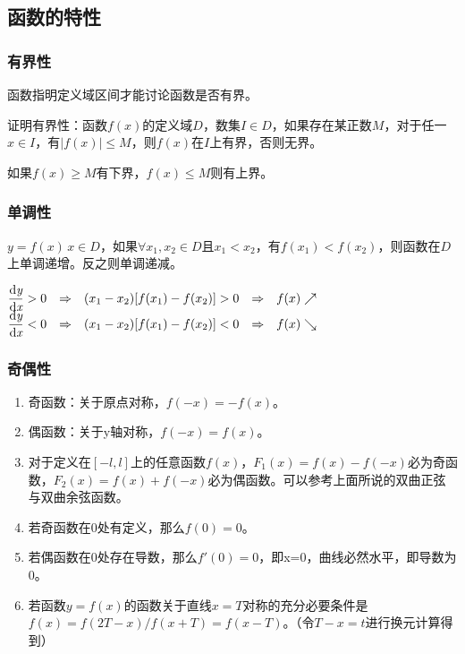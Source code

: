 \documentclass[UTF8, 12pt]{ctexart}
\begin{document}
    \subsection{函数的特性}

    \subsubsection{有界性}

    函数指明定义域区间才能讨论函数是否有界。

    证明有界性：函数$f(x)$的定义域$D$，数集$I\in D$，如果存在某正数$M$，对于任一$x\in I$，有$\vert f(x)\vert\leqslant M$，则$f(x)$在$I$上有界，否则无界。

    如果$f(x)\geqslant M$有下界，$f(x)\leqslant M$则有上界。

    \subsubsection{单调性}

    $y=f(x)\,x\in D$，如果$\forall x_1,x_2\in D$且$x_1<x_2$，有$f(x_1)<f(x_2)$，则函数在$D$上单调递增。反之则单调递减。

    \medskip

    $\begin{matrix}
         \dfrac{\rm{d}\textit{y}}{\rm{d}\textit{x}}>0 & \Rightarrow & (x_1-x_2)[f(x_1)-f(x_2)]>0 & \Rightarrow & f(x)\nearrow \\
         \dfrac{\rm{d}\textit{y}}{\rm{d}\textit{x}}<0 & \Rightarrow & (x_1-x_2)[f(x_1)-f(x_2)]<0 & \Rightarrow & f(x)\searrow
    \end{matrix}
    $

    \subsubsection{奇偶性}

    \begin{enumerate}
        \item 奇函数：关于原点对称，$f(-x)=-f(x)$。
        \item 偶函数：关于y轴对称，$f(-x)=f(x)$。
        \item 对于定义在$[-l,l]$上的任意函数$f(x)$，$F_1(x)=f(x)-f(-x)$必为奇函数，$F_2(x)=f(x)+f(-x)$必为偶函数。可以参考上面所说的双曲正弦与双曲余弦函数。
        \item 若奇函数在0处有定义，那么$f(0)=0$。
        \item 若偶函数在0处存在导数，那么$f'(0)=0$，即x=0，曲线必然水平，即导数为0。
        \item 若函数$y=f(x)$的函数关于直线$x=T$对称的充分必要条件是$f(x)=f(2T-x)/f(x+T)=f(x-T)$。（令$T-x=t$进行换元计算得到）
    \end{enumerate}
\end{document}
